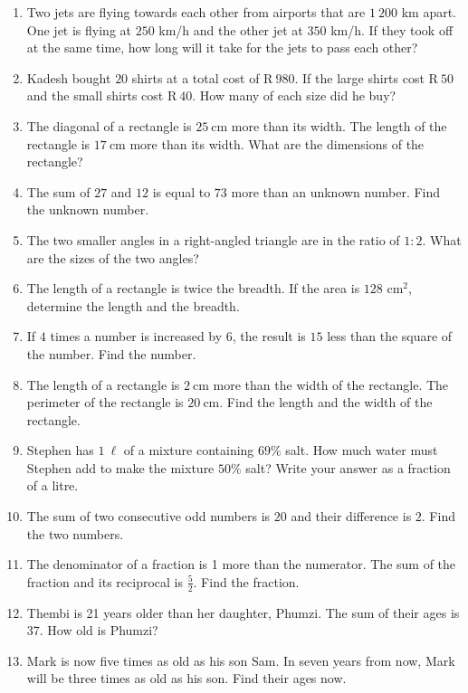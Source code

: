 \begin{exercises}{}
{
\begin{enumerate}[noitemsep, label=\textbf{\arabic*}. ] 
\item Two jets are flying towards each other from airports that are $1~200$ km apart. One jet is flying at $250$ km/h and the other jet at $350$ km/h. If they took off at the same time, how long will it take for the jets to pass each other?
\item Kadesh bought $20$ shirts at a total cost of R$~980$. If the
  large shirts cost R$~50$ and the small shirts cost R$~40$. How many
  of each size did he buy?
\item The diagonal of a rectangle is $25~$cm more than its width. The length of the rectangle is $17~$cm more than its width. What are the dimensions of the rectangle?  
\item The sum of $27$ and $12$ is equal to $73$ more than an unknown number. Find the unknown number.
\item The two smaller angles in a right-angled triangle are in the ratio of $1:2$. What are the sizes of the two angles? 
\item The length of a rectangle is twice the breadth. If the area is $128$ cm$^{2}$, determine the length and the breadth.       
\item If $4$ times a number is increased by $6$, the result is $15$ less than the square of the number. Find the number.
\item The length of a rectangle is $2~$cm more than the width of the rectangle. The perimeter of the rectangle is $20~$cm. Find the length and the width of the rectangle.
\item Stephen has $1~\ell{}$ of a mixture containing $69\%$ salt. How much water must Stephen add to make the mixture $50\%$ salt? Write your answer as a fraction of a litre.
\item The sum of two consecutive odd numbers is $20$ and their difference is $2$. Find the two numbers. 
\item The denominator of a fraction is 1 more than the numerator. The sum of the fraction and its reciprocal is $\frac{5}{2}$. Find the fraction.
\item Thembi is 21 years older than her daughter, Phumzi. The sum of their ages is 37. How old is Phumzi?
\item Mark is now five times as old as his son Sam. In seven years from now, Mark will be three times as old as his son. Find their ages now.  
\end{enumerate}

}
\end{exercises}


